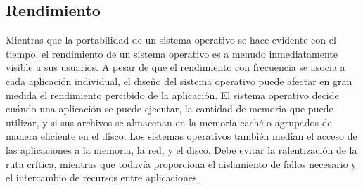 \documentclass[10pt]{book}
\begin{document}
\subsection{Rendimiento}
Mientras que la portabilidad de un sistema operativo se hace evidente con el tiempo, el rendimiento de un sistema operativo es a menudo inmediatamente visible a sus usuarios. A pesar de que el rendimiento con frecuencia se asocia a cada aplicación individual, el diseño del sistema operativo puede afectar en gran medida el rendimiento percibido de la aplicación. El sistema operativo decide cuándo una aplicación se puede ejecutar, la cantidad de memoria que puede utilizar, y si sus archivos se almacenan en la memoria caché o agrupados de manera eficiente en el disco. Los sistemas operativos también median el acceso de las aplicaciones a la memoria, la red, y el disco. Debe evitar la ralentización de la ruta crítica, mientras que todavía proporciona el aislamiento de fallos necesario y el intercambio de recursos entre aplicaciones.
\end{document}

